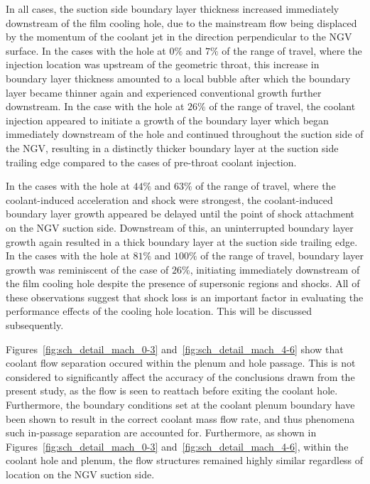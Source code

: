 \documentclass[a4paper, 11pt, oneside]{report}
\begin{document}
In all cases, the suction side boundary layer thickness increased immediately downstream of the film cooling hole, due to the mainstream flow being displaced by the momentum of the coolant jet in the direction perpendicular to the NGV surface. In the cases with the hole at $0\%$ and $7\%$ of the range of travel, where the injection location was upstream of the geometric throat, this increase in boundary layer thickness amounted to a local bubble after which the boundary layer became thinner again and experienced conventional growth further downstream. In the case with the hole at $26\%$ of the range of travel, the coolant injection appeared to initiate a growth of the boundary layer which began immediately downstream of the hole and continued throughout the suction side of the NGV, resulting in a distinctly thicker boundary layer at the suction side trailing edge compared to the cases of pre-throat coolant injection.

In the cases with the hole at $44\%$ and $63\%$ of the range of travel, where the coolant-induced acceleration and shock were strongest, the coolant-induced boundary layer growth appeared be delayed until the point of shock attachment on the NGV suction side. Downstream of this, an uninterrupted boundary layer growth again resulted in a thick boundary layer at the suction side trailing edge. In the cases with the hole at $81\%$ and $100\%$ of the range of travel, boundary layer growth was reminiscent of the case of $26\%$, initiating immediately downstream of the film cooling hole despite the presence of supersonic regions and shocks. All of these observations suggest that shock loss is an important factor in evaluating the performance effects of the cooling hole location. This will be discussed subsequently.

Figures~\ref{fig:sch_detail_mach_0-3} and~\ref{fig:sch_detail_mach_4-6} show that coolant flow separation occured within the plenum and hole passage. This is not considered to significantly affect the accuracy of the conclusions drawn from the present study, as the flow is seen to reattach before exiting the coolant hole. Furthermore, the boundary conditions set at the coolant plenum boundary have been shown to result in the correct coolant mass flow rate, and thus phenomena such in-passage separation are accounted for. Furthermore, as shown in Figures~\ref{fig:sch_detail_mach_0-3} and~\ref{fig:sch_detail_mach_4-6}, within the coolant hole and plenum, the flow structures remained highly similar regardless of location on the NGV suction side.
\end{document}
